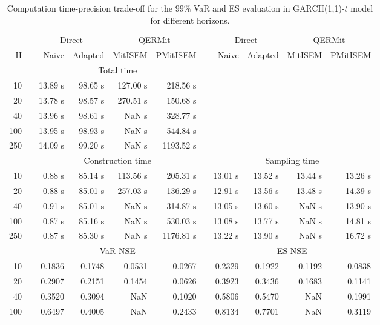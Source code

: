 \footnotesize{  
{ \renewcommand{\arraystretch}{1.3} 
\begin{longtable}{rr rrrr r rrrr}  
\caption{Computation time-precision trade-off for the  $99\%$ VaR and ES evaluation in GARCH(1,1)-$t$ model for different horizons.} 
\label{tab:time_precision_t_garch2_noS} \\ 
 & & \multicolumn{2}{c}{Direct} & \multicolumn{2}{c}{QERMit}&  & \multicolumn{2}{c}{Direct} & \multicolumn{2}{c}{QERMit} \\ \cline{3-6} \cline{8-11} 
 H & & Naive & Adapted & MitISEM & PMitISEM & & Naive & Adapted & MitISEM & PMitISEM \\ \hline 
 & & \multicolumn{4}{c}{Total time}  \\ \cline{3-6} 
10 & & 13.89 s & 98.65 s & 127.00 s & 218.56 s \\ 
20 & & 13.78 s & 98.57 s & 270.51 s & 150.68 s \\ 
40 & & 13.96 s & 98.61 s &  NaN s & 328.77 s \\ 
100 & & 13.95 s & 98.93 s &  NaN s & 544.84 s \\ 
250 & & 14.09 s & 99.20 s &  NaN s & 1193.52 s \\ 
\hline 
 & & \multicolumn{4}{c}{Construction time} & & \multicolumn{4}{c}{ Sampling time} \\ \cline{3-6}  \cline{8-11}
10 & & 0.88 s & 85.14 s & 113.56 s & 205.31 s && 13.01 s & 13.52 s & 13.44 s & 13.26 s \\ 
20 & & 0.88 s & 85.01 s & 257.03 s & 136.29 s && 12.91 s & 13.56 s & 13.48 s & 14.39 s \\ 
40 & & 0.91 s & 85.01 s &  NaN s & 314.87 s && 13.05 s & 13.60 s &  NaN s & 13.90 s \\ 
100 & & 0.87 s & 85.16 s &  NaN s & 530.03 s && 13.08 s & 13.77 s &  NaN s & 14.81 s \\ 
250 & & 0.87 s & 85.30 s &  NaN s & 1176.81 s && 13.22 s & 13.90 s &  NaN s & 16.72 s \\ 
\hline 
 & & \multicolumn{4}{c}{VaR NSE} &&  \multicolumn{4}{c}{ES NSE} \\ \cline{3-6}  \cline{8-11}
10 && 0.1836  & 0.1748  & 0.0531 & 0.0267 && 0.2329  & 0.1922  & 0.1192 & 0.0838 \\ 
20 && 0.2907  & 0.2151  & 0.1454 & 0.0626 && 0.3923  & 0.3436  & 0.1683 & 0.1141 \\ 
40 && 0.3520  & 0.3094  &    NaN & 0.1020 && 0.5806  & 0.5470  &    NaN & 0.1991 \\ 
100 && 0.6497  & 0.4005  &    NaN & 0.2433 && 0.8134  & 0.7701  &    NaN & 0.3119 \\ 

\end{longtable}}}
